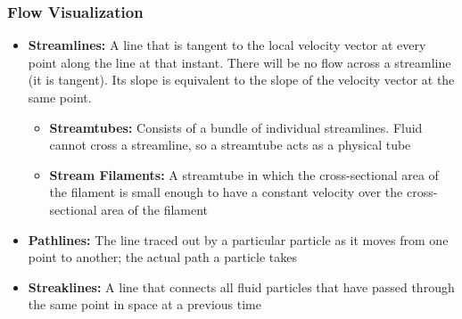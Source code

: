 \documentclass[11pt]{article}
\begin{document}
\subsubsection{Flow Visualization}
\begin{itemize}
\item \textbf{Streamlines:} A line that is tangent to the local velocity vector at every point along the line at that instant. There will be no flow across a streamline (it is tangent). Its slope is equivalent to the slope of the velocity vector at the same point.
\begin{itemize}
\item \textbf{Streamtubes:} Consists of a bundle of individual streamlines. Fluid cannot cross a streamline, so a streamtube acts as a physical tube
\item \textbf{Stream Filaments:} A streamtube in which the cross-sectional area of the filament is  small enough to have a constant velocity over the cross-sectional area of the filament
\end{itemize}
\item \textbf{Pathlines:} The line traced out by a particular particle as it moves from one point to another; the actual path a particle takes
\item \textbf{Streaklines:} A line that connects all fluid particles that have passed through the same point in space at a previous time
\end{itemize}
\end{document}
